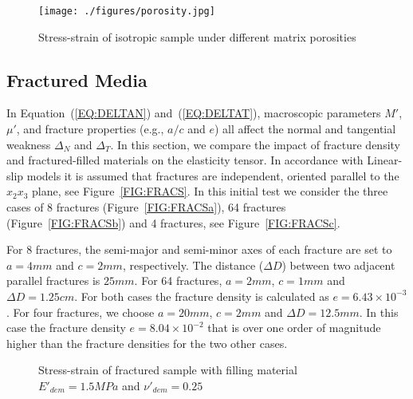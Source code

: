 \documentclass[review,authoryear]{elsarticle}
\begin{document}
\begin{figure}
\texttt{[image: ./figures/porosity.jpg]}
\centering
\caption{Stress-strain of isotropic sample under different matrix porosities}\label{FIG:POROSITY}
\end{figure}

\subsection{Fractured Media}\label{SEC:FRAC}

In Equation~(\ref{EQ:DELTAN}) and~(\ref{EQ:DELTAT}), macroscopic parameters $M'$, $\mu'$, and fracture properties (e.g., $a/c$ and $e$) all affect the normal and tangential weakness $\Delta_N$ and $\Delta_T$. In this section, we compare the impact of fracture density and fractured-filled materials on the elasticity tensor.
In accordance with Linear-slip models it is assumed that 
fractures are independent, oriented parallel to the $x_{2}x_{3}$ plane, see Figure~\ref{FIG:FRACS}. 
In this initial test we consider the three cases of 8 fractures (Figure~\ref{FIG:FRACSa}), 
64 fractures (Figure~\ref{FIG:FRACSb}) and 4 fractures, see Figure~\ref{FIG:FRACSc}.

For 8 fractures, the semi-major and semi-minor axes of each fracture are set to $a=4mm$ and $c=2mm$, respectively. 
The distance ($\Delta D$) between two adjacent parallel fractures is $25mm$. For 64 fractures, $a=2 mm$, $c=1 mm$ and $\Delta D = 1.25cm$. 
For both cases the fracture density is calculated as $e = 6.43{\times}10^{-3}$. For four fractures, we choose $a=20mm$, $c=2mm$ and $\Delta D =12.5mm$. In this case the fracture density $e=8.04{\times}10^{-2}$ that is over one order of magnitude higher than the fracture densities for the two other cases. 

\begin{figure}
\centering
\caption{Stress-strain of fractured sample with filling material $E'_{dem} = 1.5 MPa$ and $\nu'_{dem} = 0.25$ }\label{FIG:FRACS-Fluid}
\end{figure}
\end{document}
